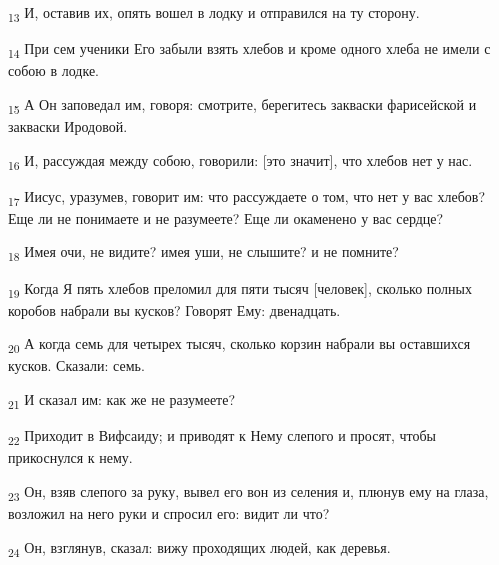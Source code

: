 \begin{tcolorbox}
\textsubscript{13} И, оставив их, опять вошел в лодку и отправился на ту сторону.
\end{tcolorbox}
\begin{tcolorbox}
\textsubscript{14} При сем ученики Его забыли взять хлебов и кроме одного хлеба не имели с собою в лодке.
\end{tcolorbox}
\begin{tcolorbox}
\textsubscript{15} А Он заповедал им, говоря: смотрите, берегитесь закваски фарисейской и закваски Иродовой.
\end{tcolorbox}
\begin{tcolorbox}
\textsubscript{16} И, рассуждая между собою, говорили: [это значит], что хлебов нет у нас.
\end{tcolorbox}
\begin{tcolorbox}
\textsubscript{17} Иисус, уразумев, говорит им: что рассуждаете о том, что нет у вас хлебов? Еще ли не понимаете и не разумеете? Еще ли окаменено у вас сердце?
\end{tcolorbox}
\begin{tcolorbox}
\textsubscript{18} Имея очи, не видите? имея уши, не слышите? и не помните?
\end{tcolorbox}
\begin{tcolorbox}
\textsubscript{19} Когда Я пять хлебов преломил для пяти тысяч [человек], сколько полных коробов набрали вы кусков? Говорят Ему: двенадцать.
\end{tcolorbox}
\begin{tcolorbox}
\textsubscript{20} А когда семь для четырех тысяч, сколько корзин набрали вы оставшихся кусков. Сказали: семь.
\end{tcolorbox}
\begin{tcolorbox}
\textsubscript{21} И сказал им: как же не разумеете?
\end{tcolorbox}
\begin{tcolorbox}
\textsubscript{22} Приходит в Вифсаиду; и приводят к Нему слепого и просят, чтобы прикоснулся к нему.
\end{tcolorbox}
\begin{tcolorbox}
\textsubscript{23} Он, взяв слепого за руку, вывел его вон из селения и, плюнув ему на глаза, возложил на него руки и спросил его: видит ли что?
\end{tcolorbox}
\begin{tcolorbox}
\textsubscript{24} Он, взглянув, сказал: вижу проходящих людей, как деревья.
\end{tcolorbox}
